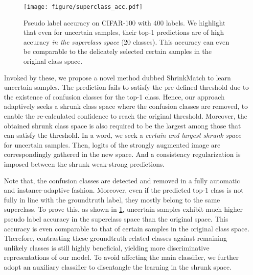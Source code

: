 \documentclass[10pt,twocolumn,letterpaper]{article}
\begin{document}
\begin{figure}
    \centering
    \texttt{[image: figure/superclass\_acc.pdf]}
    \caption{Pseudo label accuracy on CIFAR-100 with 400 labels. We highlight that even for uncertain samples, their top-1 predictions are of high accuracy \emph{in the superclass space} (20 classes). This accuracy can even be comparable to the delicately selected certain samples in the original class space.}
    \vspace{-2mm}
    \label{fig:superclass}
\vspace{-4mm}
\end{figure}


Invoked by these, we propose a novel method dubbed ShrinkMatch to learn uncertain samples. The prediction fails to satisfy the pre-defined threshold due to the existence of confusion classes for the top-1 class. Hence, our approach adaptively seeks a shrunk class space where the confusion classes are removed, to enable the re-calculated confidence to reach the original threshold. Moreover, the obtained shrunk class space is also required to be the largest among those that can satisfy the threshold. In a word, we seek a \emph{certain and largest shrunk space} for uncertain samples. Then, logits of the strongly augmented image are correspondingly gathered in the new space. And a consistency regularization is imposed between the shrunk weak-strong predictions. 

Note that, the confusion classes are detected and removed in a fully automatic and instance-adaptive fashion. Moreover, even if the predicted top-1 class is not fully in line with the groundtruth label, they mostly belong to the same superclass. To prove this, as shown in \cref{fig:superclass}, uncertain samples exhibit much higher pseudo label accuracy in the superclass space than the original space. This accuracy is even comparable to that of certain samples in the original class space.  Therefore, contrasting these groundtruth-related classes against remaining unlikely classes is still highly beneficial, yielding more discriminative representations of our model. To avoid affecting the main classifier, we further adopt an auxiliary classifier to disentangle the learning in the shrunk space.
\end{document}

